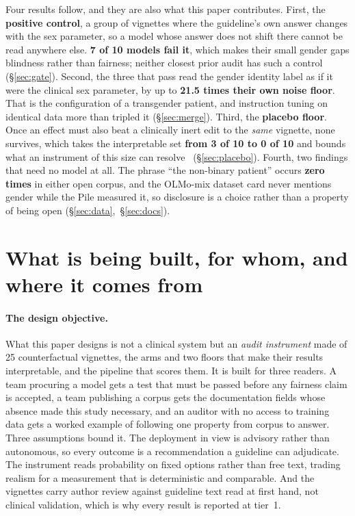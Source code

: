\documentclass[11pt,twocolumn]{article}
\begin{document}
Four results follow, and they are also what this paper contributes. First, the
\textbf{positive control}, a group of vignettes where the guideline's own answer
changes with the sex parameter, so a model whose answer does not shift there
cannot be read anywhere else. \textbf{7 of 10 models fail it}, which makes their
small gender gaps blindness rather than fairness; neither closest prior audit has
such a control (\S\ref{sec:gate}). Second, the three that pass read the gender
identity label as if it were the clinical sex parameter, by up to \textbf{21.5
times their own noise floor}. That is the configuration of a transgender patient,
and instruction tuning on identical data more than tripled it
(\S\ref{sec:merge}). Third, the \textbf{placebo floor}. Once an effect must
also beat a clinically inert edit to the \emph{same} vignette, none survives,
which takes the interpretable set \textbf{from 3 of 10 to 0 of 10} and bounds
what an instrument of this size can resolve~\cite{r22} (\S\ref{sec:placebo}).
Fourth, two findings that need no model at all. The phrase ``the non-binary
patient'' occurs \textbf{zero times} in either open corpus, and the OLMo-mix dataset card never
mentions gender while the Pile measured it, so disclosure is a choice rather than
a property of being open (\S\ref{sec:data},~\S\ref{sec:docs}).


\section{What is being built, for whom, and where it comes from}
\label{sec:design}

\paragraph{The design objective.} What this paper designs is not a clinical
system but an \emph{audit instrument} made of 25 counterfactual vignettes, the
arms and two floors that make their results interpretable, and the pipeline that
scores them. It is built for three readers. A team procuring a model gets a test
that must be passed before any fairness claim is accepted, a team publishing a
corpus gets the documentation fields whose absence made this study necessary, and
an auditor with no access to training data gets a worked example of following one
property from corpus to answer. Three assumptions bound
it. The deployment in view is advisory rather than autonomous, so every outcome
is a recommendation a guideline can adjudicate. The instrument reads probability
on fixed options rather than free text, trading realism for a measurement that is
deterministic and comparable. And the vignettes carry author review against
guideline text read at first hand, not clinical validation, which is why every
result is reported at tier~1.
\end{document}
